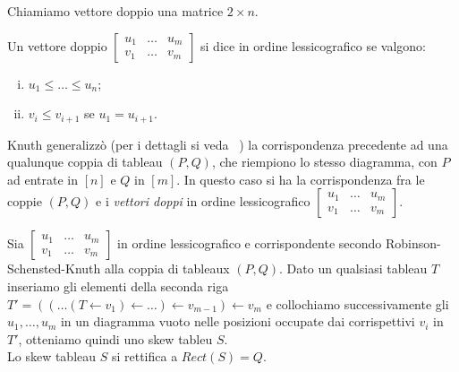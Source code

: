 \begin{notaz}
Chiamiamo vettore doppio una matrice $2 \times n$. 
\end{notaz}

\begin{defn}
Un vettore doppio
\begin{math}
\begin{bmatrix}
u_1 & \ldots & u_m\\
v_1 & \ldots & v_m
\end{bmatrix}
\end{math}
si dice in ordine lessicografico se valgono:
\begin{enumerate}[(i)]
\item $u_1 \leq \ldots \leq u_n$;
\item $v_i \leq v_{i+1}$ se $u_1 = u_{i+1}$.
\end{enumerate}
\end{defn}

Knuth generalizz\`o (per i dettagli si veda ~\cite{fulton1997young})
la corrispondenza precedente ad una qualunque coppia di
tableau $(P,Q)$, che riempiono lo stesso diagramma, con $P$ ad entrate
in $[n]$ e $Q$ in $[m]$. In questo caso si ha la corrispondenza fra le
coppie $(P,Q)$ e i \emph{vettori doppi} in ordine lessicografico
\begin{math}
\begin{bmatrix}
u_1 & \ldots & u_m\\
v_1 & \ldots & v_m
\end{bmatrix}
\end{math}.

\begin{prop}
Sia
\begin{math}
\begin{bmatrix}
u_1 & \ldots & u_m\\
v_1 & \ldots & v_m
\end{bmatrix}
\end{math}
in ordine lessicografico e corrispondente secondo
Robinson-Schensted-Knuth alla coppia di tableaux $(P,Q)$. Dato un
qualsiasi tableau $T$ inseriamo gli elementi della seconda riga
$T' = ((\ldots (T \gets v_1) \gets \ldots ) \gets v_{m-1} ) \gets v_m$ e
collochiamo successivamente gli $u_1, \ldots, u_m$ in un diagramma
vuoto nelle posizioni occupate dai corrispettivi $v_i$ in $T'$,
otteniamo quindi uno skew tableu $S$.\\
Lo skew tableau $S$ si rettifica a $Rect(S)=Q$.
\end{prop}

